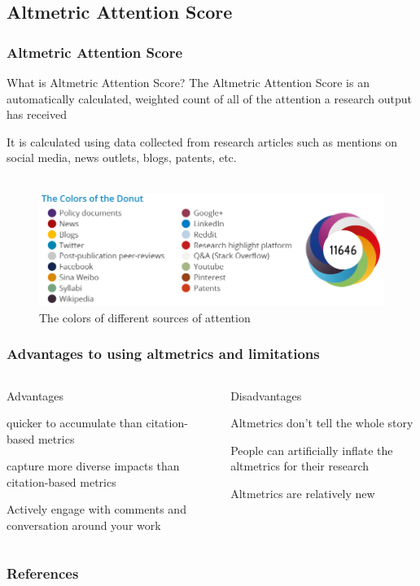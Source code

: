 \documentclass{beamer}
\begin{document}
\subsection{Altmetric Attention Score}
\begin{frame}
    \frametitle{Altmetric Attention Score}
    \begin{block}{What is Altmetric Attention Score?}
       The Altmetric Attention Score is an automatically calculated, weighted count of all of the attention a research output has received
    \end{block}

    It is calculated using data collected from research articles such as mentions
    on social media, news outlets, blogs, patents, etc.\\~\

    \begin{figure}[h]
        \includegraphics[height=0.41\textheight]{2.png}
        \caption{The colors of different sources of attention}
    \end{figure}
\end{frame}
\begin{frame}
    \frametitle{Advantages to using altmetrics and limitations}
    \begin{columns}[T]
        \begin{column}{.5\textwidth}
            \centering Advantages
            \begin{propslist}
                \item quicker to accumulate than citation-based metrics \pause
                \item capture more diverse impacts than citation-based metrics \pause
                \item Actively engage with comments and conversation around your work \pause
            \end{propslist}
        \end{column}
        \begin{column}{.5\textwidth}
            \centering Disadvantages %
            \begin{conslist}
                \item Altmetrics don’t tell the whole story \pause
                \item People can artificially inflate the altmetrics for their research \pause
                \item Altmetrics are relatively new \pause
            \end{conslist}
        \end{column}
    \end{columns}
\end{frame}

\begin{frame}[allowframebreaks]
    \frametitle{References}

    
    

\end{frame}
\end{document}

